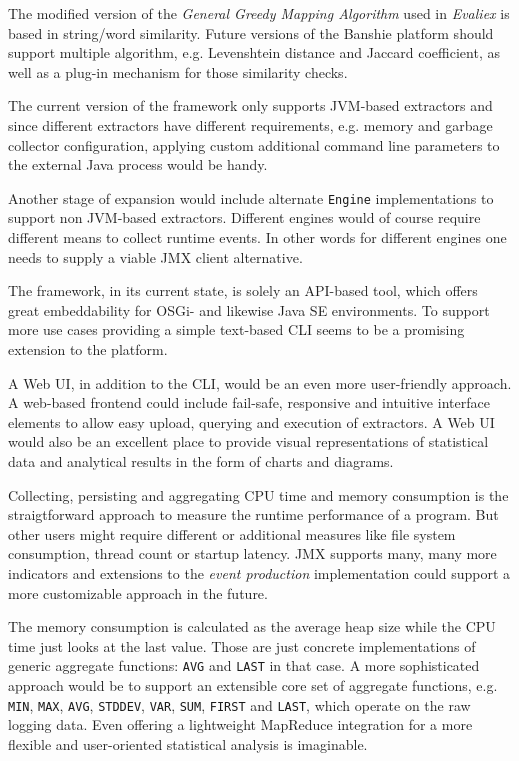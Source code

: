 The modified version of the \textit{General Greedy Mapping Algorithm} used in \textit{Evaliex} is based in string/word similarity. Future versions of the Banshie platform should support multiple algorithm, e.g. Levenshtein distance and Jaccard coefficient, as well as a plug-in mechanism for those similarity checks.

The current version of the framework only supports \gls{JVM}-based extractors and since different extractors have different requirements, e.g. memory and garbage collector configuration, applying custom additional command line parameters to the external Java process would be handy.

Another stage of expansion would include alternate \texttt{Engine} implementations to support non \gls{JVM}-based extractors. Different engines would of course require different means to collect runtime events. In other words for different engines one needs to supply a viable \gls{JMX} client alternative.

The framework, in its current state, is solely an \gls{API}-based tool, which offers great embeddability for \gls{OSGi}- and likewise Java SE environments. To support more use cases providing a simple text-based \gls{CLI} seems to be a promising extension to the platform.

A Web \gls{UI}, in addition to the \gls{CLI}, would be an even more user-friendly approach. A web-based frontend could include fail-safe, responsive and intuitive interface elements to allow easy upload, querying and execution of extractors. A Web \gls{UI} would also be an excellent place to provide visual representations of statistical data and analytical results in the form of charts and diagrams.

Collecting, persisting and aggregating CPU time and memory consumption is the straigtforward approach to measure the runtime performance of a program. But other users might require different or additional measures like file system consumption, thread count or startup latency. \gls{JMX} supports many, many more indicators and extensions to the \textit{event production} implementation could support a more customizable approach in the future.

The memory consumption is calculated as the average heap size while the CPU time just looks at the last value. Those are just concrete implementations of generic aggregate functions: \texttt{AVG} and \texttt{LAST} in that case. A more sophisticated approach would be to support an extensible core set of aggregate functions, e.g. \texttt{MIN}, \texttt{MAX}, \texttt{AVG}, \texttt{STDDEV}, \texttt{VAR}, \texttt{SUM}, \texttt{FIRST} and \texttt{LAST}, which operate on the raw logging data. Even offering a lightweight MapReduce integration for a more flexible and user-oriented statistical analysis is imaginable.